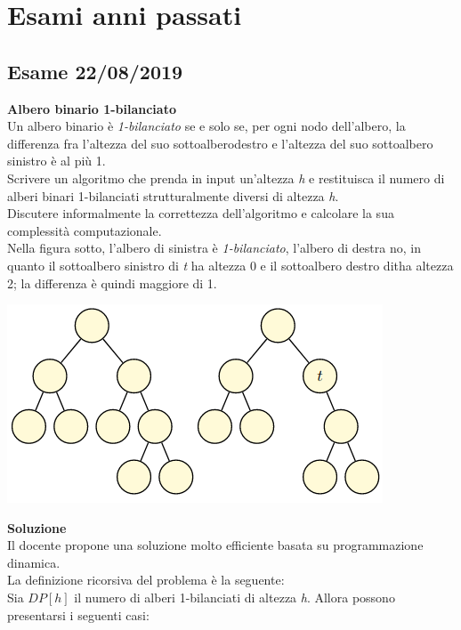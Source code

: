 \documentclass[../cheatSheetAlgoritmi.tex]{subfiles}
\begin{document}
\section{Esami anni passati}
\subsection{Esame 22/08/2019}
\textbf{Albero binario 1-bilanciato} \\
Un albero binario è \emph{1-bilanciato} se e solo se, per ogni nodo dell'albero, la differenza fra l'altezza del suo sottoalberodestro e l'altezza del suo sottoalbero sinistro è al più 1. \\
Scrivere un algoritmo che prenda in input un’altezza \emph{h} e restituisca il numero di alberi binari 1-bilanciati strutturalmente diversi di altezza \emph{h}. \\
Discutere informalmente la correttezza dell’algoritmo e calcolare la sua complessità computazionale. \\
Nella figura sotto, l’albero di sinistra è \emph{1-bilanciato}, l'albero di destra no, in quanto il sottoalbero sinistro di \emph{t} ha altezza 0 e il sottoalbero destro ditha altezza 2; la differenza è quindi maggiore di 1.
\begin{center}
	\includegraphics{ ../img/esame_22082019}
\end{center}
\textbf{Soluzione}  \\
Il docente propone una soluzione molto efficiente basata su programmazione dinamica. \\
La definizione ricorsiva del problema è la seguente: \\ 
Sia $DP[h]$ il numero di alberi 1-bilanciati di altezza \emph{h}. Allora possono presentarsi i seguenti casi:
\end{document}

